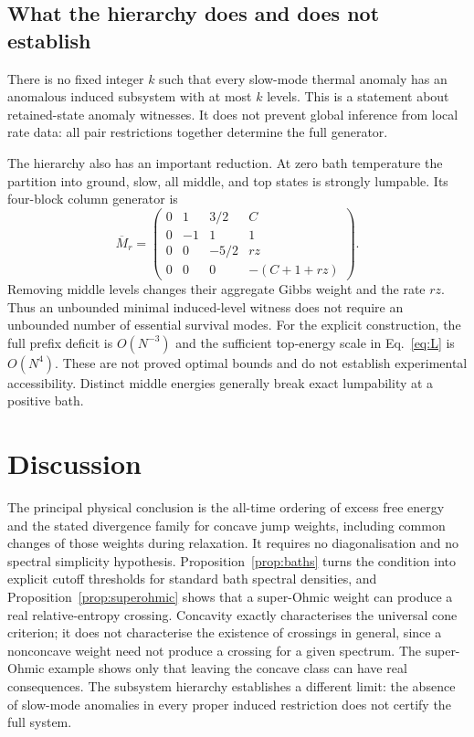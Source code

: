 \documentclass[11pt,a4paper]{article}
\theoremstyle{remark}\newtheorem{remark}[theorem]{Remark}
\begin{document}
\subsection{What the hierarchy does and does not establish}
There is no fixed integer $k$ such that every slow-mode thermal anomaly has an anomalous induced subsystem with at most $k$ levels. This is a statement about retained-state anomaly witnesses. It does not prevent global inference from local rate data: all pair restrictions together determine the full generator.

The hierarchy also has an important reduction. At zero bath temperature the partition into ground, slow, all middle, and top states is strongly lumpable. Its four-block column generator is
\begin{equation}
 \overline M_r=\begin{pmatrix}
 0&1&3/2&C\\0&-1&1&1\\0&0&-5/2&rz\\0&0&0&-(C+1+rz)
 \end{pmatrix}.
 \label{eq:lump}
\end{equation}
Removing middle levels changes their aggregate Gibbs weight and the rate $rz$. Thus an unbounded minimal induced-level witness does not require an unbounded number of essential survival modes. For the explicit construction, the full prefix deficit is $O(N^{-3})$ and the sufficient top-energy scale in Eq.~\eqref{eq:L} is $O(N^4)$. These are not proved optimal bounds and do not establish experimental accessibility. Distinct middle energies generally break exact lumpability at a positive bath.

\section{Discussion}\label{sec:discussion}
The principal physical conclusion is the all-time ordering of excess free energy and the stated divergence family for concave jump weights, including common changes of those weights during relaxation. It requires no diagonalisation and no spectral simplicity hypothesis. Proposition~\ref{prop:baths} turns the condition into explicit cutoff thresholds for standard bath spectral densities, and Proposition~\ref{prop:superohmic} shows that a super-Ohmic weight can produce a real relative-entropy crossing. Concavity exactly characterises the universal cone criterion; it does not characterise the existence of crossings in general, since a nonconcave weight need not produce a crossing for a given spectrum. The super-Ohmic example shows only that leaving the concave class can have real consequences. The subsystem hierarchy establishes a different limit: the absence of slow-mode anomalies in every proper induced restriction does not certify the full system.
\end{document}
